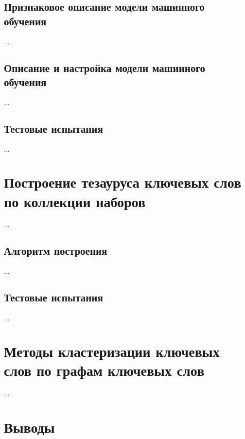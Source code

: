 \subsection{Признаковое описание модели машинного обучения}
...
\subsection{Описание и настройка модели машинного обучения}
...

\subsection{Тестовые испытания}
...
\section{Построение тезауруса ключевых слов по коллекции наборов}
...
\subsection{Алгоритм построения}
...
\subsection{Тестовые испытания}
...
\section{Методы кластеризации ключевых слов по графам ключевых слов}
...
\section{Выводы}
